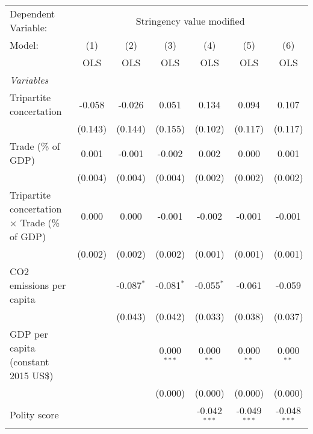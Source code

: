
\begingroup
\centering
\begin{tabular}{lcccccc}
   \toprule
   Dependent Variable: & \multicolumn{6}{c}{Stringency value modified}\\
   Model:                                               & (1)     & (2)          & (3)           & (4)            & (5)            & (6)\\  
                                                        &  OLS    & OLS          & OLS           & OLS            & OLS            & OLS\\  
   \midrule
   \emph{Variables}\\
   Tripartite concertation                              & -0.058  & -0.026       & 0.051         & 0.134          & 0.094          & 0.107\\   
                                                        & (0.143) & (0.144)      & (0.155)       & (0.102)        & (0.117)        & (0.117)\\   
   Trade (\% of GDP)                                    & 0.001   & -0.001       & -0.002        & 0.002          & 0.000          & 0.001\\   
                                                        & (0.004) & (0.004)      & (0.004)       & (0.002)        & (0.002)        & (0.002)\\   
   Tripartite concertation $\times$ Trade (\% of GDP)   & 0.000   & 0.000        & -0.001        & -0.002         & -0.001         & -0.001\\   
                                                        & (0.002) & (0.002)      & (0.002)       & (0.001)        & (0.001)        & (0.001)\\   
   CO2 emissions per capita                             &         & -0.087$^{*}$ & -0.081$^{*}$  & -0.055$^{*}$   & -0.061         & -0.059\\   
                                                        &         & (0.043)      & (0.042)       & (0.033)        & (0.038)        & (0.037)\\   
   GDP per capita (constant 2015 US\$)                  &         &              & 0.000$^{***}$ & 0.000$^{**}$   & 0.000$^{**}$   & 0.000$^{**}$\\   
                                                        &         &              & (0.000)       & (0.000)        & (0.000)        & (0.000)\\   
   Polity score                                         &         &              &               & -0.042$^{***}$ & -0.049$^{***}$ & -0.048$^{***}$\\   

\end{tabular}
